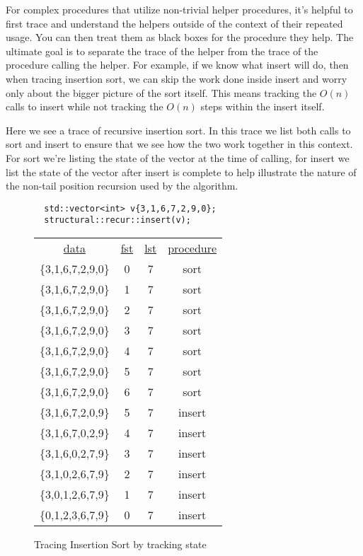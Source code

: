 \documentclass[10pt]{article}
\begin{document}
For complex procedures that utilize non-trivial helper procedures, it's helpful to first trace and understand the helpers outside of the context of their repeated usage. You can then treat them as black boxes for the procedure they help. The ultimate goal is to separate the trace of the helper from the trace of the procedure calling the helper. For example, if we know what insert will do, then when tracing insertion sort, we can skip the work done inside insert and worry only about the bigger picture of the sort itself. This means tracking the $O(n)$ calls to insert while not tracking the $O(n)$ steps within the insert itself.

\newpage \thispagestyle{empty}


Here we see a trace of recursive insertion sort. In this trace we list both calls
to sort and insert to ensure that we see how the two work together in this context.
For sort we're listing the state of the vector at the time of calling, for insert we list
the state of the vector after insert is complete to help illustrate the nature of the non-tail position recursion used by the algorithm.

\begin{figure}[!htbp]

\begin{lstlisting}
  std::vector<int> v{3,1,6,7,2,9,0};
  structural::recur::insert(v);
\end{lstlisting}

\begin{tabular}{cccc}
\underline{data} & \underline{fst} & \underline{lst} & \underline{procedure}\\
 \{3,1,6,7,2,9,0\} & 0 & 7 & sort \\
 \{3,1,6,7,2,9,0\} & 1 & 7 & sort \\
 \{3,1,6,7,2,9,0\} & 2 & 7 & sort \\
 \{3,1,6,7,2,9,0\} & 3 & 7 & sort \\
 \{3,1,6,7,2,9,0\} & 4 & 7 & sort \\
 \{3,1,6,7,2,9,0\} & 5 & 7 & sort \\
 \{3,1,6,7,2,9,0\} & 6 & 7 & sort \\
 \{3,1,6,7,2,0,9\} & 5 & 7 & insert \\
 \{3,1,6,7,0,2,9\} & 4 & 7 & insert \\
 \{3,1,6,0,2,7,9\} & 3 & 7 & insert \\
 \{3,1,0,2,6,7,9\} & 2 & 7 & insert \\
 \{3,0,1,2,6,7,9\} & 1 & 7 & insert \\
 \{0,1,2,3,6,7,9\} & 0 & 7 & insert
\end{tabular}
\caption{Tracing Insertion Sort by tracking state}
\end{figure}
\end{document}
